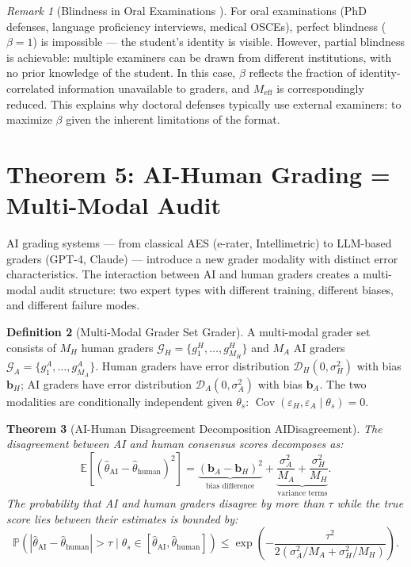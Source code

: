 \documentclass[11pt,a4paper]{article}
\newtheorem{theorem}{Theorem}[section]
\theoremstyle{definition}
\newtheorem{definition}[theorem]{Definition}
\theoremstyle{remark}
\newtheorem{remark}[theorem]{Remark}
\DeclareMathOperator{\Cov}{Cov}
\newcommand{\E}{\mathbb{E}}
\newcommand{\Pbb}{\mathbb{P}}
\newcommand{\cD}{\mathcal{D}}
\newcommand{\cG}{\mathcal{G}}
\newcommand{\trueScore}{\theta}
\newcommand{\biasVec}{\mathbf{b}}
\begin{document}
\begin{remark}[Blindness in Oral Examinations ]
For oral examinations (PhD defenses, language proficiency interviews, medical OSCEs), perfect blindness ($\beta=1$) is impossible — the student's identity is visible. However, partial blindness is achievable: multiple examiners can be drawn from different institutions, with no prior knowledge of the student. In this case, $\beta$ reflects the fraction of identity-correlated information unavailable to graders, and $M_{\text{eff}}$ is correspondingly reduced. This explains why doctoral defenses typically use external examiners: to maximize $\beta$ given the inherent limitations of the format.
\end{remark}
\section{Theorem 5: AI-Human Grading = Multi-Modal Audit}
\label{sec:theorem5}
AI grading systems — from classical AES (e-rater, Intellimetric) to LLM-based graders (GPT-4, Claude) — introduce a new grader modality with distinct error characteristics. The interaction between AI and human graders creates a multi-modal audit structure: two expert types with different training, different biases, and different failure modes.
\begin{definition}[Multi-Modal Grader Set Grader]
\label{def:multimodal}
A multi-modal grader set consists of $M_H$ human graders $\cG_H = \{g_1^H, \ldots, g_{M_H}^H\}$ and $M_A$ AI graders $\cG_A = \{g_1^A, \ldots, g_{M_A}^A\}$. Human graders have error distribution $\cD_H(0, \sigma_H^2)$ with bias $\biasVec_H$; AI graders have error distribution $\cD_A(0, \sigma_A^2)$ with bias $\biasVec_A$. The two modalities are conditionally independent given $\trueScore_s$: $\Cov(\varepsilon_H, \varepsilon_A \mid \trueScore_s) = 0$.
\end{definition}
\begin{theorem}[AI-Human Disagreement Decomposition AIDisagreement]
\label{thm:multimodal}
The disagreement between AI and human consensus scores decomposes as:
\begin{equation}
    \E[(\hat{\theta}_{\text{AI}} - \hat{\theta}_{\text{human}})^2] = \underbrace{(\biasVec_A - \biasVec_H)^2}_{\text{bias difference}} + \underbrace{\frac{\sigma_A^2}{M_A} + \frac{\sigma_H^2}{M_H}}_{\text{variance terms}}.
    \label{eq:ai_human_decomp}
\end{equation}
The probability that AI and human graders disagree by more than $\tau$ while the true score lies between their estimates is bounded by:
\begin{equation}
    \Pbb(|\hat{\theta}_{\text{AI}} - \hat{\theta}_{\text{human}}| > \tau \mid \trueScore_s \in [\hat{\theta}_{\text{AI}}, \hat{\theta}_{\text{human}}]) \le \exp\left(-\frac{\tau^2}{2(\sigma_A^2/M_A + \sigma_H^2/M_H)}\right).
    \label{eq:disagreement_bound}
\end{equation}
\end{theorem}
\end{document}
